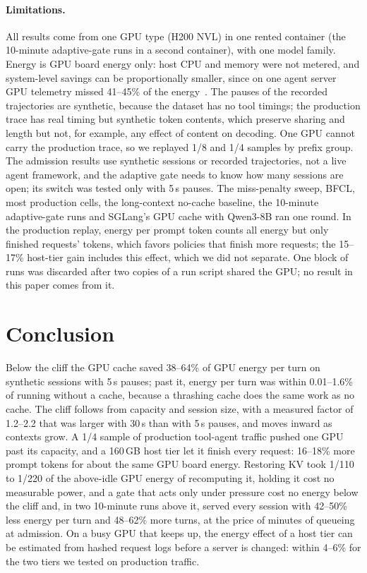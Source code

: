 \paragraph{Limitations.}
\label{sec:limits}
All results come from one GPU type (H200 NVL) in one rented container (the 10-minute adaptive-gate runs in a second container), with one model family. Energy is GPU board
energy only: host CPU and memory were not metered, and system-level savings can be proportionally smaller, since on one agent server GPU telemetry
missed 41--45\% of the energy~\cite{luo2026where}. The pauses of the recorded trajectories are synthetic, because the dataset has
no tool timings; the production trace has real timing but synthetic token contents, which preserve sharing and length
but not, for example, any effect of content on decoding. One GPU cannot carry the production trace, so we replayed
1/8 and 1/4 samples by prefix group. The admission results use
synthetic sessions or recorded trajectories, not a live agent framework, and the adaptive gate needs to know how many
sessions are open; its switch was tested only with 5\,s pauses. The miss-penalty sweep, BFCL, most production cells, the long-context no-cache baseline, the 10-minute adaptive-gate runs and SGLang's GPU cache
with Qwen3-8B ran one round. In the production replay, energy per prompt token counts all energy but only finished
requests' tokens, which favors policies that finish more requests; the 15--17\% host-tier gain includes this effect,
which we did not separate. One block of runs was
discarded after two copies of a run script shared the GPU; no result in this paper comes from it.

\section{Conclusion}

Below the cliff the GPU cache saved 38--64\% of GPU energy per turn on synthetic sessions with 5\,s pauses; past it, energy per turn was within
0.01--1.6\% of running without a cache, because a thrashing cache does the same work as no cache. The cliff follows from capacity and session size, with a measured factor of 1.2--2.2 that was larger with 30\,s than with 5\,s pauses, and
moves inward as contexts grow. A 1/4 sample of production tool-agent traffic pushed one GPU past its capacity, and a 160\,GB host tier
let it finish every request: 16--18\% more prompt tokens for about the same GPU board energy. Restoring KV took
1/110 to 1/220 of the above-idle GPU energy of recomputing it, holding it cost no measurable power, and a gate that
acts only under pressure cost no energy below the cliff and, in two 10-minute runs above it, served every session with
42--50\% less energy per turn and 48--62\% more turns, at the price of minutes of queueing at admission. On a busy GPU that keeps up, the energy effect of a host tier
can be estimated from hashed request logs before a server is changed: within 4--6\% for the two tiers we tested on production traffic.
